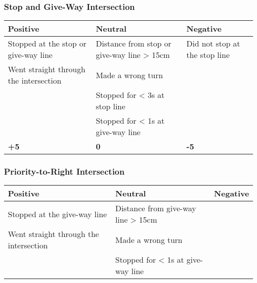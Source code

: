 {\begin{highlight}
		\subsubsection*{Stop and Give-Way Intersection}
		\begin{table}[H]
			\begin{tabularx}{\textwidth}{XXX}
				\toprule
				\textbf{Positive}                      & \textbf{Neutral}                           & \textbf{Negative}                              \\
				\midrule
				Stopped at the stop or give-way line   & Distance from stop or give-way line > 15cm & Did not stop at the stop line \footnotemark[3] \\
				Went straight through the intersection & Made a wrong turn                          &                                                \\
				                                       & Stopped for < 3s at stop line              &                                                \\
				                                       & Stopped for < 1s at give-way line          &                                                \\
				\topstrut
				\textbf{+5}                            & \textbf{0}                                 & \textbf{-5}                                    \\
				\bottomrule
			\end{tabularx}
		\end{table}

		\subsubsection*{Priority-to-Right Intersection}
		\begin{table}[H]
			\begin{tabularx}{\textwidth}{XXX}
				\toprule
				\textbf{Positive}                      & \textbf{Neutral}                   & \textbf{Negative}                    \\
				\midrule
				Stopped at the give-way line           & Distance from give-way line > 15cm &                                      \\
				Went straight through the intersection & Made a wrong turn                  &                                      \\
				                                       & Stopped for < 1s at give-way line  &                                      \\


\end{tabularx}
\end{table}
\end{highlight}}
